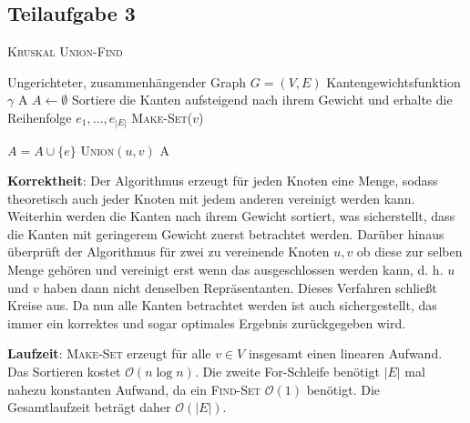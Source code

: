 \documentclass[a4paper, fontsize=10pt]{scrartcl}
\begin{document}
\subsection*{Teilaufgabe 3}
\begin{algorithm}[H]
  \caption{\textsc{Kruskal Union-Find}}
    \begin{algorithmic}[1]
        \REQUIRE  Ungerichteter, zusammenhängender Graph $G=(V,E)$ Kantengewichtsfunktion $\gamma$
        \ENSURE A 
        \STATE $A \leftarrow \emptyset$
        \STATE Sortiere die Kanten aufsteigend nach ihrem Gewicht und erhalte die Reihenfolge $e_1,\dots,e_{|E|}$
              \STATE \textsc{Make-Set}($v$)
            \ENDFOR 
            
                \STATE $A=A\cup \{e\}$
                \STATE \textsc{Union}$(u,v)$
                \ENDIF
            \ENDFOR
      \RETURN A       
  \end{algorithmic}
\end{algorithm}\bigskip

\textbf{Korrektheit}: 
Der Algorithmus erzeugt für jeden Knoten eine Menge, sodass theoretisch auch jeder Knoten mit jedem anderen vereinigt werden kann. Weiterhin werden die Kanten nach ihrem Gewicht sortiert, was sicherstellt, dass die Kanten mit geringerem Gewicht zuerst betrachtet werden. Darüber hinaus überprüft der Algorithmus für zwei zu vereinende Knoten $u,v$ ob diese zur selben Menge gehören und vereinigt erst wenn das ausgeschlossen werden kann, d. h. $u$ und $v$ haben dann nicht denselben Repräsentanten. Dieses Verfahren schließt Kreise aus. Da nun alle Kanten betrachtet werden ist auch sichergestellt, das immer ein korrektes und sogar optimales Ergebnis zurückgegeben wird. \smallskip

\textbf{Laufzeit}:
\textsc{Make-Set} erzeugt für alle $v\in V$ insgesamt einen linearen Aufwand. Das Sortieren kostet $\mathcal{O}(n\log n)$. Die zweite For-Schleife benötigt $|E|$ mal nahezu konstanten Aufwand, da ein \textsc{Find-Set} $\mathcal{O}(1)$ benötigt. Die Gesamtlaufzeit beträgt daher $\mathcal{O}(|E|)$. 
\end{document}
